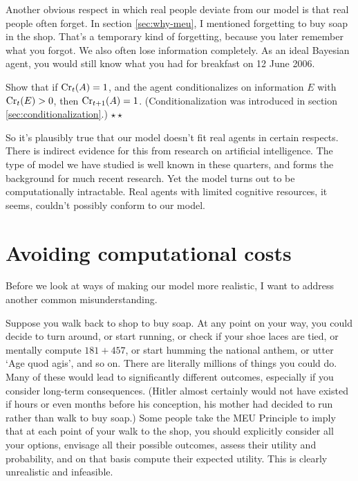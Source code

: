 Another obvious respect in which real people deviate from our model is
that real people often forget. In section \ref{sec:why-meu}, I
mentioned forgetting to buy soap in the shop. That's a temporary kind
of forgetting, because you later remember what you forgot. We also
often lose information completely. As an ideal Bayesian agent, you
would still know what you had for breakfast on 12 June 2006.

\begin{exercise}
  Show that if $\text{Cr}_t(A) = 1$, and the agent conditionalizes on
  information $E$ with $\text{Cr}_t(E) > 0$, then $\text{Cr}_{t+1}(A) =
  1$. (Conditionalization was introduced in
  section \ref{sec:conditionalization}.) $\star\star$
\end{exercise}


So it's plausibly true that our model doesn't fit real agents in
certain respects. There is indirect evidence for this from research on
artificial intelligence. The type of model we have studied is well
known in these quarters, and forms the background for much recent
research.%
Yet the model turns out to be computationally intractable. Real agents
with limited cognitive resources, it seems, couldn't possibly conform
to our model.


\section{Avoiding computational costs}

Before we look at ways of making our model more realistic, I want to
address another common misunderstanding.

Suppose you walk back to shop to buy soap. At any point on your way,
you could decide to turn around, or start running, or check if your
shoe laces are tied, or mentally compute $181 + 457$, or start humming
the national anthem, or utter `Age quod agis', and so on. There are
literally millions of things you could do. Many of these would lead to
significantly different outcomes, especially if you consider long-term
consequences. (Hitler almost certainly would not have existed if hours
or even months before his conception, his mother had decided to run
rather than walk to buy soap.) Some people take the MEU Principle to
imply that at each point of your walk to the shop, you should
explicitly consider all your options, envisage all their possible
outcomes, assess their utility and probability, and on that basis
compute their expected utility. This is clearly unrealistic and
infeasible.

